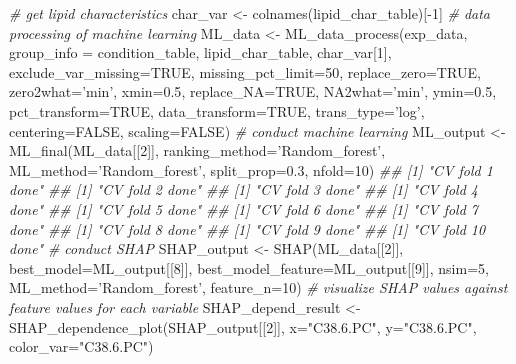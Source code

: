 \documentclass[]{article}
\newcommand{\hlnum}[1]{\textcolor[rgb]{0.816,0.125,0.439}{#1}}%
\newcommand{\hlstr}[1]{\textcolor[rgb]{0.251,0.627,0.251}{#1}}%
\newcommand{\hlcom}[1]{\textcolor[rgb]{0.502,0.502,0.502}{\textit{#1}}}%
\newcommand{\hlopt}[1]{\textcolor[rgb]{0,0,0}{#1}}%
\newcommand{\hlstd}[1]{\textcolor[rgb]{0.251,0.251,0.251}{#1}}%
\newcommand{\hlkwc}[1]{\textcolor[rgb]{0.251,0.251,0.251}{#1}}%
\newcommand{\hlkwd}[1]{\textcolor[rgb]{0.878,0.439,0.125}{#1}}%
\newenvironment{Shaded}{\begin{myshaded}}{\end{myshaded}}
\newcommand{\KeywordTok}[1]{\hlkwd{#1}}
\newcommand{\DataTypeTok}[1]{\hlkwc{#1}}
\newcommand{\DecValTok}[1]{\hlnum{#1}}
\newcommand{\FloatTok}[1]{\hlnum{#1}}
\newcommand{\StringTok}[1]{\hlstr{#1}}
\newcommand{\CommentTok}[1]{\hlcom{#1}}
\newcommand{\OtherTok}[1]{{#1}}
\newcommand{\OperatorTok}[1]{\hlopt{#1}}
\newcommand{\NormalTok}[1]{\hlstd{#1}}
\begin{document}
\begin{Shaded}
\begin{Highlighting}[]
\CommentTok{# get lipid characteristics}
\NormalTok{char_var <-}\StringTok{ }\KeywordTok{colnames}\NormalTok{(lipid_char_table)[}\OperatorTok{-}\DecValTok{1}\NormalTok{]}
\CommentTok{# data processing of machine learning}
\NormalTok{ML_data <-}\StringTok{ }\KeywordTok{ML_data_process}\NormalTok{(exp_data, }\DataTypeTok{group_info =}\NormalTok{ condition_table,}
\NormalTok{                           lipid_char_table, char_var[}\DecValTok{1}\NormalTok{],}
                           \DataTypeTok{exclude_var_missing=}\OtherTok{TRUE}\NormalTok{, }\DataTypeTok{missing_pct_limit=}\DecValTok{50}\NormalTok{,}
                           \DataTypeTok{replace_zero=}\OtherTok{TRUE}\NormalTok{, }\DataTypeTok{zero2what=}\StringTok{'min'}\NormalTok{, }\DataTypeTok{xmin=}\FloatTok{0.5}\NormalTok{,}
                           \DataTypeTok{replace_NA=}\OtherTok{TRUE}\NormalTok{, }\DataTypeTok{NA2what=}\StringTok{'min'}\NormalTok{, }\DataTypeTok{ymin=}\FloatTok{0.5}\NormalTok{,}
                           \DataTypeTok{pct_transform=}\OtherTok{TRUE}\NormalTok{, }\DataTypeTok{data_transform=}\OtherTok{TRUE}\NormalTok{,}
                           \DataTypeTok{trans_type=}\StringTok{'log'}\NormalTok{, }\DataTypeTok{centering=}\OtherTok{FALSE}\NormalTok{, }\DataTypeTok{scaling=}\OtherTok{FALSE}\NormalTok{)}
\CommentTok{# conduct machine learning}
\NormalTok{ML_output <-}\StringTok{ }\KeywordTok{ML_final}\NormalTok{(ML_data[[}\DecValTok{2}\NormalTok{]], }\DataTypeTok{ranking_method=}\StringTok{'Random_forest'}\NormalTok{,}
                      \DataTypeTok{ML_method=}\StringTok{'Random_forest'}\NormalTok{, }\DataTypeTok{split_prop=}\FloatTok{0.3}\NormalTok{, }\DataTypeTok{nfold=}\DecValTok{10}\NormalTok{)}
\CommentTok{## [1] "CV fold 1 done"}
\CommentTok{## [1] "CV fold 2 done"}
\CommentTok{## [1] "CV fold 3 done"}
\CommentTok{## [1] "CV fold 4 done"}
\CommentTok{## [1] "CV fold 5 done"}
\CommentTok{## [1] "CV fold 6 done"}
\CommentTok{## [1] "CV fold 7 done"}
\CommentTok{## [1] "CV fold 8 done"}
\CommentTok{## [1] "CV fold 9 done"}
\CommentTok{## [1] "CV fold 10 done"}
\CommentTok{# conduct SHAP}
\NormalTok{SHAP_output <-}\StringTok{ }\KeywordTok{SHAP}\NormalTok{(ML_data[[}\DecValTok{2}\NormalTok{]], }\DataTypeTok{best_model=}\NormalTok{ML_output[[}\DecValTok{8}\NormalTok{]],}
                    \DataTypeTok{best_model_feature=}\NormalTok{ML_output[[}\DecValTok{9}\NormalTok{]], }\DataTypeTok{nsim=}\DecValTok{5}\NormalTok{,}
                    \DataTypeTok{ML_method=}\StringTok{'Random_forest'}\NormalTok{, }\DataTypeTok{feature_n=}\DecValTok{10}\NormalTok{)}
\CommentTok{# visualize SHAP values against feature values for each variable}
\NormalTok{SHAP_depend_result <-}\StringTok{ }\KeywordTok{SHAP_dependence_plot}\NormalTok{(SHAP_output[[}\DecValTok{2}\NormalTok{]], }\DataTypeTok{x=}\StringTok{"C38.6.PC"}\NormalTok{,}
                                           \DataTypeTok{y=}\StringTok{"C38.6.PC"}\NormalTok{, }\DataTypeTok{color_var=}\StringTok{"C38.6.PC"}\NormalTok{)}
\end{Highlighting}
\end{Shaded}
\end{document}
